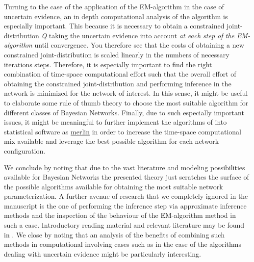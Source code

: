 \documentclass[11pt]{article}
\begin{document}
\begin{article}
Turning to the case of the application of the EM-algorithm in the
case of uncertain evidence, an in depth computational analysis of
the algorithm is especially important. This because it is necessary
to obtain a constrained joint-distribution \emph{Q} taking the uncertain
evidence into account \emph{at each step of the EM-algorithm} until
convergence. You therefore see that the costs of obtaining a new
constrained joint-distribution is scaled linearly in the numbers of
necessary iterations steps. Therefore, it is especially important
to find the right combination of time-space computational effort
such that the overall effort of obtaining the constrained
joint-distribution and performing inference in the network is
minimized for the network of interest. In this sense, it might be
useful to elaborate some rule of thumb theory to choose the most
suitable algorithm for different classes of Bayesian
Networks. Finally, due to such especially important issues, it might
be meaningful to further implement the algorithms of
\cite{Valtorta_2002} into statistical software as \href{https://github.com/radum2275/merlin}{merlin} in order to
increase the time-space computational mix available and leverage
the best possible algorithm for each network configuration.

We conclude by noting that due to the vast literature and modeling
possibilities available for Bayesian Networks the presented theory
just scratches the surface of the possible algorithms available for
obtaining the most suitable network parameterization. A further
avenue of research that we completely ignored in the manuscript is
the one of performing the inference step via approximate inference
methods and the inspection of the behaviour of the EM-algorithm
method in such a case. Introductory reading material and relevant
literature may be found in \cite{koller2009probabilistic}. We close
by noting that an analysis of the benefits of combining such methods
in computational involving cases such as in the case of the
algorithms dealing with uncertain evidence might be particularly
interesting.

\newpage





\cleardoublepage

\end{article}
\end{document}
